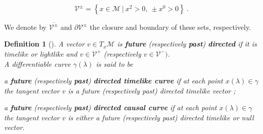 \documentclass[11pt]{book}
\newcommand{\Mcal}{\mathcal{M}}
\newcommand{\Vcal}{\mathcal{V}}
\theoremstyle{break}
\newtheorem{definition}{Definition}
\begin{document}
\begin{equation*}
\Vcal^{\pm}=\left\{ x\in\Mcal \ | \ x^{2}>0, \ \pm x^{0}>0 \right\} \ . 
\end{equation*}

We denote by $\overline{\Vcal^{\pm}}$ and $\partial\Vcal^{\pm}$ the closure and boundary of these sets, respectively. \par

\begin{definition}[]
A vector $v \in T_x\Mcal$ is \textbf{future} (respectively \textbf{past}) \textbf{directed} if it is timelike or lightlike and $v \in \Vcal^+$ (respectively $v \in \Vcal^-)$. \\[3pt]
A differentiable curve $\gamma(\lambda)$ is said to be 

\begin{description}
\item a \textbf{future} (respectively \textbf{past}) \textbf{directed timelike curve} if at each point $x(\lambda) \in \gamma$ the tangent vector $v$ is a future (respectively past) directed timelike vector ;
\item a \textbf{future} (respectively \textbf{past}) \textbf{directed causal curve} if at each point $x(\lambda) \in \gamma$ the tangent vector $v$ is either a future (respectively past) directed timelike or null vector. 
\end{description} 

\end{definition}
\end{document}
